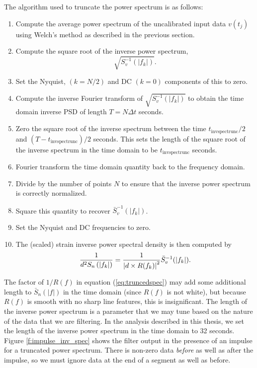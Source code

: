 The algorithm used to truncate the power spectrum is as follows:
\begin{enumerate}
\item Compute the average power spectrum of the uncalibrated input data
$v(t_j)$ using Welch's method as described in the previous section.
\item Compute the square root of the inverse power spectrum,
\begin{equation}
\sqrt{S^{-1}_v(|f_k|)}.
\end{equation}
\item Set the Nyquist, $(k = N/2)$ and DC $(k = 0)$ components of this to zero.
\item Compute the inverse Fourier transform of $\sqrt{S^{-1}_v(|f_k|)}$ to
obtain the time domain inverse PSD of length $T = N\Delta t$ seconds.  \item
Zero the square root of the inverse spectrum between the time
$t_\mathrm{invspectrunc}/2$ and $(T-t_\mathrm{invspectrunc})/2$
seconds. This sets the length of the square root of the inverse spectrum in
the time domain to be $t_\mathrm{invspectrunc}$ seconds.
\item Fourier transform the time domain quantity back to the frequency domain.
\item Divide by the number of points $N$ to ensure that the inverse power
spectrum is correctly normalized.
\item Square this quantity to recover $\bar{S}^{-1}_v(|f_k|)$.
\item Set the Nyquist and DC frequencies to zero.
\item The (scaled) strain inverse power spectral density is then computed by
\begin{equation}
\frac{1}{d^2S_n\left(\left|f_{k}\right|\right)} = \frac{1}{\left|d \times R(f_k)\right|^2} \bar{S}^{-1}_v(|f_k|).
\label{eq:truncedspec}
\end{equation}
\end{enumerate}
The factor of $1/R(f)$ in equation (\ref{eq:truncedspec}) may add some
additional length to $\bar{S}_n(|f|)$ in the time domain (since $R(f)$ is not
white), but because $R(f)$ is smooth with no sharp line features, this is
insignificant.
The length of the inverse power spectrum is a parameter that we may tune based
on the nature of the data that we are filtering. In the analysis described
in this thesis, we set the length of the inverse power spectrum in the time
domain to 32 seconds.  Figure \ref{f:impulse_inv_spec} shows the filter output
in the presence of an impulse for a truncated power spectrum. There is
non-zero data \emph{before} as well as after the impulse, so we must ignore
data at the end of a segment as well as before.

